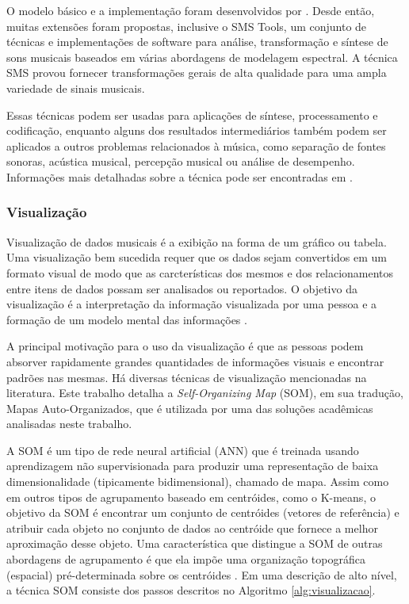 O modelo básico e a implementação foram desenvolvidos por . Desde então, muitas extensões foram propostas, inclusive o SMS Tools, um conjunto de técnicas e implementações de software para análise, transformação e síntese de sons musicais baseados em várias abordagens de modelagem espectral. A técnica SMS provou fornecer transformações gerais de alta qualidade para uma ampla variedade de sinais musicais.

Essas técnicas podem ser usadas para aplicações de síntese, processamento e codificação, enquanto alguns dos resultados intermediários também podem ser aplicados a outros problemas relacionados à música, como separação de fontes sonoras, acústica musical, percepção musical ou análise de desempenho. Informações mais detalhadas sobre a técnica pode ser encontradas em \cite{serra1990}.

\subsubsection{Visualização} \label{subsubsec:visualizacao}
Visualização de dados musicais é a exibição na forma de um gráfico ou tabela. Uma visualização bem sucedida requer que os dados sejam convertidos em um formato visual de modo que as carcterísticas dos mesmos e dos relacionamentos entre itens de dados possam ser analisados ou reportados. O objetivo da visualização é a interpretação da informação visualizada por uma pessoa e a formação de um modelo mental das informações \cite{pang2009}.

A principal motivação para o uso da visualização é que as pessoas podem absorver rapidamente grandes quantidades de informações visuais e encontrar padrões nas mesmas. Há diversas técnicas de visualização mencionadas na literatura. Este trabalho detalha a \textit{Self-Organizing Map} (SOM), em sua tradução, Mapas Auto-Organizados, que é utilizada por uma das soluções acadêmicas analisadas neste trabalho.

A SOM é um tipo de rede neural artificial (ANN) que é treinada usando aprendizagem não supervisionada para produzir uma representação de baixa dimensionalidade (tipicamente bidimensional), chamado de mapa. Assim como em outros tipos de agrupamento baseado em centróides, como o K-means, o objetivo da SOM é encontrar um conjunto de centróides (vetores de referência) e atribuir cada objeto no conjunto de dados ao centróide que fornece a melhor aproximação desse objeto. Uma característica que distingue a SOM de outras abordagens de agrupamento é que ela impõe uma organização topográfica (espacial) pré-determinada sobre os centróides \cite{pang2009}. Em uma descrição de alto nível, a técnica SOM consiste dos passos descritos no Algoritmo \ref{alg:visualizacao}.

